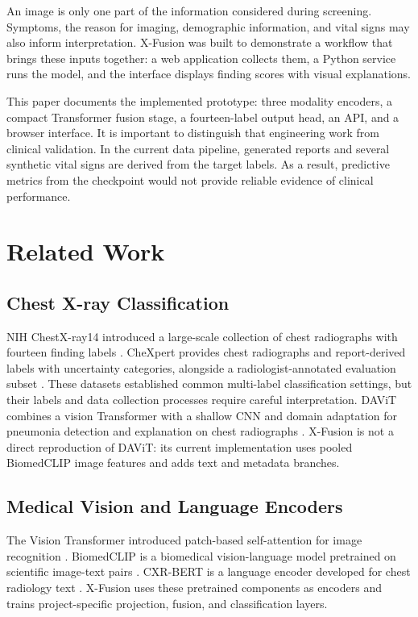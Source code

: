 \documentclass[conference]{IEEEtran}
\begin{document}
An image is only one part of the information considered during screening. Symptoms, the reason for imaging, demographic information, and vital signs may also inform interpretation. X-Fusion was built to demonstrate a workflow that brings these inputs together: a web application collects them, a Python service runs the model, and the interface displays finding scores with visual explanations.

This paper documents the implemented prototype: three modality encoders, a compact Transformer fusion stage, a fourteen-label output head, an API, and a browser interface. It is important to distinguish that engineering work from clinical validation. In the current data pipeline, generated reports and several synthetic vital signs are derived from the target labels. As a result, predictive metrics from the checkpoint would not provide reliable evidence of clinical performance.

\section{Related Work}
\subsection{Chest X-ray Classification}
NIH ChestX-ray14 introduced a large-scale collection of chest radiographs with fourteen finding labels \cite{wang2017}. CheXpert provides chest radiographs and report-derived labels with uncertainty categories, alongside a radiologist-annotated evaluation subset \cite{irvin2019}. These datasets established common multi-label classification settings, but their labels and data collection processes require careful interpretation. DAViT combines a vision Transformer with a shallow CNN and domain adaptation for pneumonia detection and explanation on chest radiographs \cite{davit2025}. X-Fusion is not a direct reproduction of DAViT: its current implementation uses pooled BiomedCLIP image features and adds text and metadata branches.

\subsection{Medical Vision and Language Encoders}
The Vision Transformer introduced patch-based self-attention for image recognition \cite{dosovitskiy2021}. BiomedCLIP is a biomedical vision-language model pretrained on scientific image-text pairs \cite{biomedclip2023}. CXR-BERT is a language encoder developed for chest radiology text \cite{cxrbert2022}. X-Fusion uses these pretrained components as encoders and trains project-specific projection, fusion, and classification layers.
\end{document}
